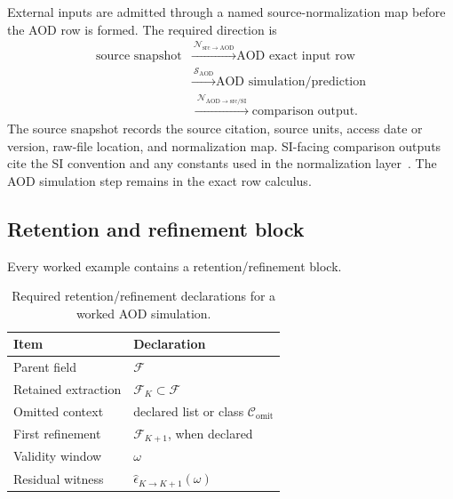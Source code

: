 External inputs are admitted through a named source-normalization map before the AOD row is formed. The required direction is
\[
\begin{aligned}
\text{source snapshot}
&\xrightarrow{\ \mathcal N_{\mathrm{src}\to\mathrm{AOD}}\ }
\text{AOD exact input row}\\
&\xrightarrow{\ \mathcal S_{\mathrm{AOD}}\ }
\text{AOD simulation/prediction}\\
&\xrightarrow{\ \mathcal N_{\mathrm{AOD}\to\mathrm{src/SI}}\ }
\text{comparison output}.
\end{aligned}
\]
The source snapshot records the source citation, source units, access date or version, raw-file location, and normalization map. SI-facing comparison outputs cite the SI convention and any constants used in the normalization layer~\cite{bipm_si_brochure_2025,nist_constants_complete}. The AOD simulation step remains in the exact row calculus.

\subsection{Retention and refinement block}
\label{man:workflow-retention-block}

Every worked example contains a retention/refinement block.
\begin{table}[H]
\centering
\caption{Required retention/refinement declarations for a worked AOD simulation.}
\label{tab:retention-refinement-template}
\begin{threeparttable}
\begin{tabularx}{\linewidth}{@{}lX@{}}
\toprule
Item & Declaration \\
\midrule
Parent field & \(\mathcal F\) \\
Retained extraction & \(\mathcal F_K\subset\mathcal F\) \\
Omitted context & declared list or class \(\mathcal C_{\mathrm{omit}}\) \\
First refinement & \(\mathcal F_{K+1}\), when declared \\
Validity window & \(\omega\) \\
Residual witness & \(\widehat\epsilon_{K\to K+1}(\omega)\) \\
\bottomrule
\end{tabularx}
\end{threeparttable}
\end{table}

